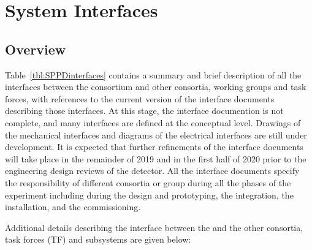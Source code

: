 \section{System Interfaces}
\label{sec:fdsp-pd-intfc}


\subsection{Overview}
Table~\ref{tbl:SPPDinterfaces} contains a summary and brief description of all the interfaces between the   consortium and other consortia, working groups and task forces, with references to the current version of the interface documents describing those interfaces.  At this stage,  the interface documention is  not complete, and many interfaces are defined at the conceptual level. Drawings of the mechanical interfaces and diagrams of the electrical interfaces are still under development. It is expected that further refinements of the interface documents will take place in the remainder of 2019 and in the first half of 2020 prior to the engineering design reviews of the detector. All the interface documents specify the responsibility of different consortia or group during all the phases of the experiment including during the design and prototyping, the integration, the installation, and the commissioning.

Additional details describing the interface between the   and %
the other consortia, task forces (TF) and subsystems are given below:



